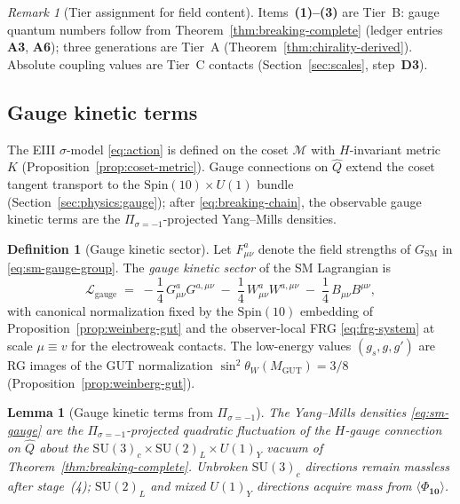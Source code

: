\documentclass[11pt]{article}
\theoremstyle{plain}
\newtheorem{lemma}[theorem]{Lemma}
\theoremstyle{definition}
\newtheorem{definition}[theorem]{Definition}
\theoremstyle{remark}
\newtheorem{remark}[theorem]{Remark}
\numberwithin{equation}{section}
\newcommand{\Spin}{\mathrm{Spin}}
\begin{document}
\begin{remark}[Tier assignment for field content]
Items~\textbf{(1)--(3)} are Tier~B: gauge quantum numbers follow from
Theorem~\ref{thm:breaking-complete} (ledger entries \textbf{A3}, \textbf{A6});
three generations are Tier~A
(Theorem~\ref{thm:chirality-derived}). Absolute coupling values are Tier~C
contacts (Section~\ref{sec:scales}, step~\textbf{D3}).
\end{remark}

\subsection{Gauge kinetic terms}
\label{sec:sm-lagrangian:gauge}

The EIII $\sigma$-model \eqref{eq:action} is defined on the coset
$\mathcal{M}$ with $H$-invariant metric $K$ (Proposition~\ref{prop:coset-metric}).
Gauge connections on $\hat Q$ extend the coset tangent transport to the
$\Spin(10)\times U(1)$ bundle (Section~\ref{sec:physics:gauge}); after
\eqref{eq:breaking-chain}, the observable gauge kinetic terms are the
$\Pi_{\sigma=-1}$-projected Yang--Mills densities.

\begin{definition}[Gauge kinetic sector]\label{def:sm-gauge}
Let $F_{\mu\nu}^a$ denote the field strengths of $G_{\mathrm{SM}}$ in
\eqref{eq:sm-gauge-group}. The \emph{gauge kinetic sector} of the SM
Lagrangian is
\begin{equation}\label{eq:sm-gauge}
  \mathcal{L}_{\mathrm{gauge}}
  \;=\;
  -\frac{1}{4}\,G_{\mu\nu}^a G^{a,\mu\nu}
  \;-\;
  \frac{1}{4}\,W_{\mu\nu}^a W^{a,\mu\nu}
  \;-\;
  \frac{1}{4}\,B_{\mu\nu} B^{\mu\nu},
\end{equation}
with canonical normalization fixed by the $\Spin(10)$ embedding of
Proposition~\ref{prop:weinberg-gut} and the observer-local FRG
\eqref{eq:frg-system} at scale $\mu\equiv v$ for the electroweak contacts.
The low-energy values $(g_s,g,g')$ are RG images of the GUT normalization
$\sin^2\theta_W(M_{\mathrm{GUT}})=3/8$ (Proposition~\ref{prop:weinberg-gut}).
\end{definition}

\begin{lemma}[Gauge kinetic terms from $\Pi_{\sigma=-1}$]
\label{lem:sm-gauge-derived}
The Yang--Mills densities \eqref{eq:sm-gauge} are the $\Pi_{\sigma=-1}$-projected
quadratic fluctuation of the $H$-gauge connection on $\hat Q$ about the
$\mathrm{SU}(3)_c\times\mathrm{SU}(2)_L\times U(1)_Y$ vacuum of
Theorem~\ref{thm:breaking-complete}. Unbroken $\mathrm{SU}(3)_c$ directions
remain massless after stage~(4); $\mathrm{SU}(2)_L$ and mixed
$U(1)_Y$ directions acquire mass from $\langle\Phi_{\mathbf{10}}\rangle$.
\end{lemma}
\end{document}
